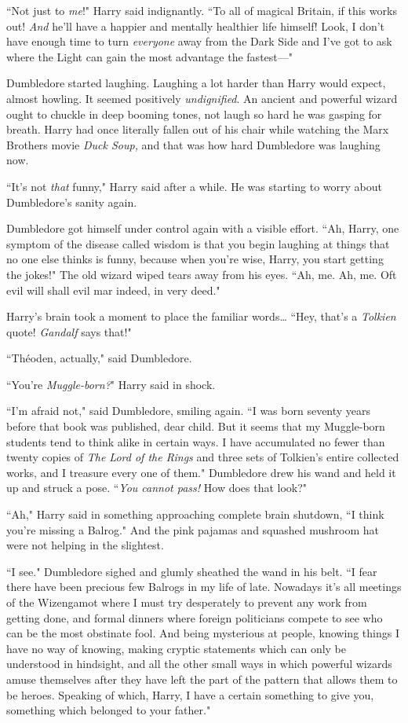 ``Not just to \emph{me}!" Harry said indignantly. ``To all of magical Britain, if this works out! \emph{And} he'll have a happier and mentally healthier life himself! Look, I don't have enough time to turn \emph{everyone} away from the Dark Side and I've got to ask where the Light can gain the most advantage the fastest—"

Dumbledore started laughing. Laughing a lot harder than Harry would expect, almost howling. It seemed positively \emph{undignified}. An ancient and powerful wizard ought to chuckle in deep booming tones, not laugh so hard he was gasping for breath. Harry had once literally fallen out of his chair while watching the Marx Brothers movie \emph{Duck Soup,} and that was how hard Dumbledore was laughing now.

``It's not \emph{that} funny," Harry said after a while. He was starting to worry about Dumbledore's sanity again.

Dumbledore got himself under control again with a visible effort. ``Ah, Harry, one symptom of the disease called wisdom is that you begin laughing at things that no one else thinks is funny, because when you're wise, Harry, you start getting the jokes!" The old wizard wiped tears away from his eyes. ``Ah, me. Ah, me. Oft evil will shall evil mar indeed, in very deed."

Harry's brain took a moment to place the familiar words{\ldots} ``Hey, that's a \emph{Tolkien} quote! \emph{Gandalf} says that!"

``Théoden, actually," said Dumbledore.

``You're \emph{Muggle-born?}" Harry said in shock.

``I'm afraid not," said Dumbledore, smiling again. ``I was born seventy years before that book was published, dear child. But it seems that my Muggle-born students tend to think alike in certain ways. I have accumulated no fewer than twenty copies of \emph{The Lord of the Rings} and three sets of Tolkien's entire collected works, and I treasure every one of them." Dumbledore drew his wand and held it up and struck a pose. ``\emph{You cannot pass!} How does that look?"

``Ah," Harry said in something approaching complete brain shutdown, ``I think you're missing a Balrog." And the pink pajamas and squashed mushroom hat were not helping in the slightest.

``I see." Dumbledore sighed and glumly sheathed the wand in his belt. ``I fear there have been precious few Balrogs in my life of late. Nowadays it's all meetings of the Wizengamot where I must try desperately to prevent any work from getting done, and formal dinners where foreign politicians compete to see who can be the most obstinate fool. And being mysterious at people, knowing things I have no way of knowing, making cryptic statements which can only be understood in hindsight, and all the other small ways in which powerful wizards amuse themselves after they have left the part of the pattern that allows them to be heroes. Speaking of which, Harry, I have a certain something to give you, something which belonged to your father."


